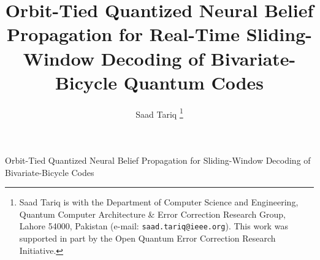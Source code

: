 \documentclass[journal]{IEEEtran}
\begin{document}
\title{Orbit-Tied Quantized Neural Belief Propagation for Real-Time Sliding-Window Decoding of Bivariate-Bicycle Quantum Codes}

\author{Saad Tariq%
\thanks{Saad Tariq is with the Department of Computer Science and Engineering, Quantum Computer Architecture \& Error Correction Research Group, Lahore 54000, Pakistan (e-mail: \texttt{saad.tariq@ieee.org}). This work was supported in part by the Open Quantum Error Correction Research Initiative.}}

%
{Orbit-Tied Quantized Neural Belief Propagation for Sliding-Window Decoding of Bivariate-Bicycle Codes}

\maketitle
\end{document}
